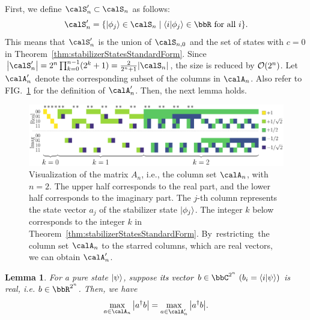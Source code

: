 \documentclass[aps,prx,onecolumn,superscriptaddress,nobibnotes,nofootinbib]{revtex4-2}
\newcommand{\black}[1]{\textcolor{black}{#1}}
\newcommand{\relmiddle}[1]{\mathrel{}\middle#1\mathrel{}}
\newtheorem{lemma}{Lemma}
\begin{document}
First, we define $\calS'_n \subset \calS_n$ as follows:
\begin{equation*}
  \calS'_n = \qty{\ket{\phi_j} \in \calS_n \relmiddle| \braket{i}{\phi_j} \in \bbR \text{ for all $i$}}.
\end{equation*}
This means that $\calS'_n$ is the union of $\calS_{n,0}$ and the set of states with $c=0$ in Theorem~\ref{thm:stabilizerStatesStandardForm}.
Since $\abs{\calS'_n} = 2^n \prod_{k=0}^{n-1} (2^k+1) = \frac{2}{2^n+1}\abs{\calS_n}$, the size is reduced by $\order{2^n}$.
Let $\calA'_n$ denote the corresponding subset of
the columns in $\calA_n$.
Also refer to FIG.~\ref{fig:Amat} for the definition of $\calA'_n$.
Then, the next lemma holds.
\begin{figure}[tbp]
  \centering
  \includegraphics[width=\columnwidth]{imgs/Amat.pdf}
  \caption{
    Visualization of the matrix $A_n$, i.e., the column set $\calA_n$, with $n=2$.
    The upper half corresponds to the real part, and the lower half corresponds to the imaginary part.
    The $j$-th column represents the state vector $a_j$ of the stabilizer state $\ket{\phi_j}$.
    The integer $k$ below corresponds to the integer $k$ in Theorem~\ref{thm:stabilizerStatesStandardForm}.
    By~restricting~the column set $\calA_n$ to the starred columns, which are real vectors, we can obtain $\calA'_n$.
  }
  \label{fig:Amat}
\end{figure}
\begin{lemma}{\label{lem:absRealForTIsAbsRealForS}}
  For a pure state $\ket{\psi}$, suppose \black{its vector $b \in \bbC^{2^n} \ (b_i = \braket{i}{\psi})$} is real, i.e. $b\in \bbR^{2^n}$.
  Then, we have
  \begin{equation*}
    \max_{a\in \calA_n} \abs{a^\dagger b} = \max_{a\in \calA'_n} \abs{a^\dagger b}.
  \end{equation*}
\end{lemma}
\end{document}
